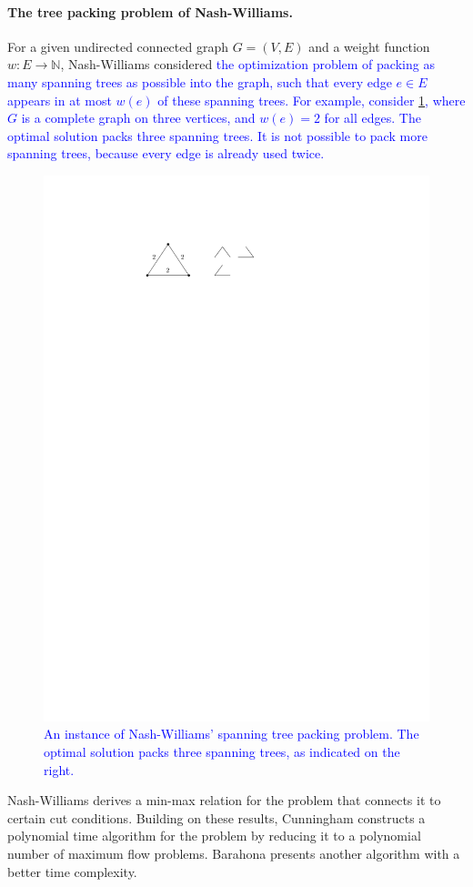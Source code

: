 \documentclass[runningheads]{llncs}
\newcommand{\NN}{\mathbb{N}}
\newcommand{\lasse}[1]{\textcolor{blue}{#1}}
\begin{document}
\paragraph{The tree packing problem of Nash-Williams.}
For a given undirected connected graph $G=(V,E)$ and a weight function $w:E\to\NN$,
Nash-Williams \cite{Nash-Williams1961} considered \lasse{the optimization problem of packing as many 
spanning trees as possible into the graph, such that every edge $e \in E$ appears in at most $w(e)$ of these spanning trees. 
For example, consider \cref{fig_spt_example}, where $G$ is a complete graph on three vertices, 
and $w(e) = 2$ for all edges. The optimal solution packs three spanning trees. It is not possible to pack more spanning trees, because every edge is already used twice.} 
\begin{figure}[htpb]
\centering
\includegraphics[scale=1]{img/stp-example}
\caption{\lasse{An instance of Nash-Williams' spanning tree packing problem. The optimal solution packs three spanning trees, as indicated on the right.}}
\label{fig_spt_example}
\end{figure}
Nash-Williams \cite{Nash-Williams1961} derives a min-max relation for the problem that connects it to certain cut conditions.
Building on these results, Cunningham \cite{Cunningham1985} constructs a polynomial time 
algorithm for the problem by reducing it to a polynomial number of maximum flow problems.
Barahona \cite{Barahona1995} presents another algorithm with a better time complexity.
\end{document}
